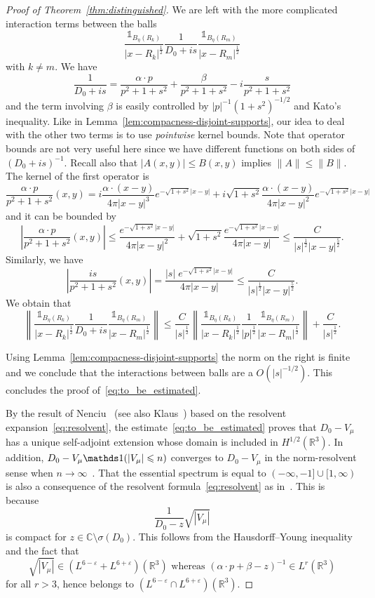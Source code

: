 \documentclass[10pt]{amsart}
\theoremstyle{definition}
\newcommand{\R}{\mathbb{R}}
\newcommand{\C}{\mathbb{C}}
\newcommand\1{{\ensuremath {\mathds 1} }}
\newcommand{\ii}{\infty}
\newcommand{\norm}[1]{ \left\| #1 \right\|}
\renewcommand{\leq}{\leqslant}
\newcommand{\eps}{\varepsilon}
\begin{document}
\begin{proof}[Proof of Theorem~\ref{thm:distinguished}]
We are left with the more complicated interaction terms between the balls
\begin{equation}\label{eq:interaction_two_balls}
\frac{\1_{B_\eta(R_k)}}{\left|x-R_k\right|^{\frac12}}\frac{1}{D_0+is}\frac{\1_{B_\eta(R_m)}}{\left|x-R_m\right|^{\frac12}}
\end{equation}
with $k\neq m$. We have
\[
\frac{1}{D_0+is}=\frac{\alpha\cdot p}{p^2+1+s^2}+\frac{\beta}{p^2+1+s^2}-i\frac{s}{p^2+1+s^2}
\]
and the term involving $\beta$ is easily controlled by $|p|^{-1}(1+s^2)^{-1/2}$ and Kato's inequality. Like in Lemma~\ref{lem:compacness-disjoint-supports}, our idea to deal with the other two terms is to use \emph{pointwise} kernel bounds. Note that operator bounds are not very useful here since we have different functions on both sides of $(D_0+is)^{-1}$. Recall also that $|A(x,y)|\leq B(x,y)$ implies $\|A\|\leq\|B\|$. The kernel of the first operator is
\[
\frac{\alpha\cdot p}{p^2+1+s^2}(x,y)=i\frac{\alpha\cdot(x-y)}{4\pi|x-y|^3}e^{-\sqrt{1+s^2}|x-y|}+i\sqrt{1+s^2}\frac{\alpha\cdot(x-y)}{4\pi|x-y|^2}e^{-\sqrt{1+s^2}|x-y|}
\]
and it can be bounded by
\[
\left|\frac{\alpha\cdot p}{p^2+1+s^2}(x,y)\right|\leq \frac{e^{-\sqrt{1+s^2}|x-y|}}{4\pi|x-y|^2}+\sqrt{1+s^2}\frac{e^{-\sqrt{1+s^2}|x-y|}}{4\pi|x-y|}\leq \frac{C}{|s|^{\frac12}|x-y|^{\frac52}}.
\]
Similarly, we have
\[
\left|\frac{is}{p^2+1+s^2}(x,y)\right|=\frac{|s|\;e^{-\sqrt{1+s^2}|x-y|}}{4\pi|x-y|}\leq \frac{C}{|s|^{\frac12}|x-y|^{\frac52}}.
\]
We obtain that
\begin{equation}
\norm{\frac{\1_{B_\eta(R_k)}}{\left|x-R_k\right|^{\frac12}}\frac{1}{D_0+is}\frac{\1_{B_\eta(R_m)}}{\left|x-R_m\right|^{\frac12}}}
\leq \frac{C}{|s|^{\frac12}}\norm{\frac{\1_{B_\eta(R_k)}}{\left|x-R_k\right|^{\frac12}}\frac{1}{|p|^{\frac12}}\frac{\1_{B_\eta(R_m)}}{\left|x-R_m\right|^{\frac12}}}+\frac{C}{|s|^{\frac12}}.
\end{equation}

\noindent Using Lemma~\ref{lem:compacness-disjoint-supports} the norm on the right is finite and we conclude that the interactions between balls are a $O(|s|^{-1/2})$. This concludes the proof of~\eqref{eq:to_be_estimated}.

By the result of Nenciu~\cite[Corollary~2.1]{Nenciu-76} (see also Klaus~\cite{Klaus-80b}) based on the resolvent expansion~\eqref{eq:resolvent}, the estimate~\eqref{eq:to_be_estimated} proves that $D_0-V_\mu$ has a unique self-adjoint extension whose domain is included in $H^{1/2}(\R^3)$. In addition, $D_0-V_\mu\1(|V_\mu|\linebreak\leq n)$ converges to $D_0-V_\mu$ in the norm-resolvent sense when $n\to\ii$~\cite{Klaus-80b,KlaWus-79}. That the essential spectrum is equal to $(-\ii,-1]\cup[1,\ii)$ is also a consequence of the resolvent formula~\eqref{eq:resolvent} as in~\cite{KlaWus-79,Nenciu-76}. This is because
\[
\frac{1}{D_0-z}\sqrt{\left|V_\mu\right|}
\]
is compact for $z\in\C\setminus\sigma(D_0)$. This follows from the Hausdorff--Young inequality and the fact that
\[
\sqrt{\left|V_\mu\right|}\in \left(L^{6-\eps}+L^{6+\eps}\right)\left(\R^3\right)\text{ whereas }\left(\alpha\cdot p+\beta -z\right)^{-1}\in L^r\left(\R^3\right)
\]
for all $r>3$, hence belongs to $(L^{6-\eps}\cap L^{6+\eps})(\R^3)$.


\end{proof}
\end{document}
